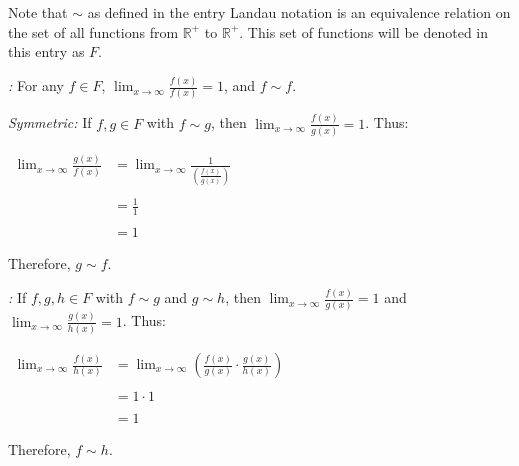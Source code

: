 \documentclass[12pt]{article}
\begin{document}
Note that $\sim$ as defined in the entry Landau notation is an equivalence relation on the set of all functions from $\mathbb{R}^+$ to $\mathbb{R}^+$.  This set of functions will be denoted in this entry as $F$.

\emph{:} For any $f \in F$, $\displaystyle \lim_{x \to \infty} \frac{f(x)}{f(x)}=1$, and $f \sim f$.

\emph{Symmetric:} If $f,g \in F$ with $f \sim g$, then $\displaystyle \lim_{x \to \infty} \frac{f(x)}{g(x)}=1$.  Thus:

\begin{center}
$\begin{array}{ll}
\displaystyle \lim_{x \to \infty} \frac{g(x)}{f(x)} & \displaystyle =\lim_{x \to \infty} \frac{1}{\left( \frac{f(x)}{g(x)} \right)} \\
\\
& \displaystyle =\frac{1}{1} \\
\\
& =1 \end{array}$
\end{center}

Therefore, $g \sim f$.

\emph{:} If $f,g,h \in F$ with $f \sim g$ and $g \sim h$, then $\displaystyle \lim_{x \to \infty} \frac{f(x)}{g(x)}=1$ and $\displaystyle \lim_{x \to \infty} \frac{g(x)}{h(x)}=1$.  Thus:

\begin{center}
$\begin{array}{ll}
\displaystyle \lim_{x \to \infty} \frac{f(x)}{h(x)} & \displaystyle =\lim_{x \to \infty} \left( \frac{f(x)}{g(x)} \cdot \frac{g(x)}{h(x)} \right) \\
\\
& =1 \cdot 1 \\
\\
& =1 \end{array}$
\end{center}

Therefore, $f \sim h$.
\end{document}
